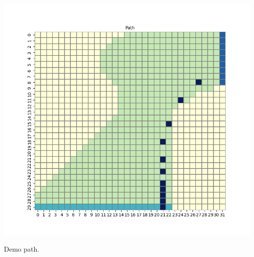 \documentclass[11pt]{article}
\begin{document}
    \includegraphics[scale=0.7]{env3_demo_e_5_12_21}

    Demo path.
\end{document}
